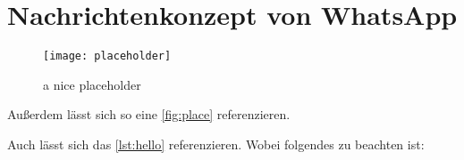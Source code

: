 \section{Nachrichtenkonzept von WhatsApp}\label{sec:kaptiel}

\blindtext

\begin{figure}[h]
    \centering
    \texttt{[image: placeholder]}
    \caption{a nice placeholder}
    \label{fig:place}
\end{figure}

\blindtext
Außerdem lässt sich so eine \autoref{fig:place} referenzieren\cite{dreyfus:1980}.




Auch lässt sich das \autoref{lst:hello} referenzieren.
Wobei folgendes zu beachten ist:
\blindtext

